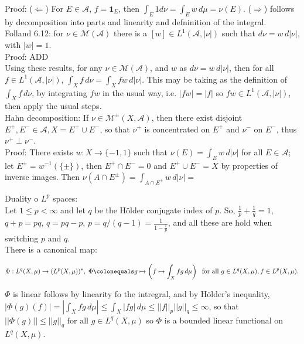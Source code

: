 \documentclass[12pt]{article}
\newcommand{\fall}[0] { \textrm{ for all } }
\newcommand{\rimply}[0] { \Rightarrow }
\newcommand{\limply}[0] { \Leftarrow }
\newcommand{\rarw}[0] { \rightarrow }
\newcommand{ \defeq }[0] { \colonequals }
\newcommand{ \cf }[1] { \mathbf{1}_{#1} }
\newcommand{\A}[0] { \mathcal{A} }
\newcommand{\M}[0] { \mathcal{M} }
\begin{document}
\noindent
Proof: ($\limply$) For $E \in \A$, $f = \cf{E}$, then $\int_E 1 d\nu = \int_E w \, d\mu = \nu(E)$. ($\rimply$) follows by decomposition into parts and linearity and defninition of the integral.   \\

Folland 6.12: for $\nu \in \M(\A)$ there is a $[w] \in L^1(\A, |\nu|)$ such that $d\nu = w \, d|\nu|$, with $|w| = 1$. \\

\noindent
Proof: ADD \\

Using these results, for any $\nu \in \M(\A)$, and $w$ as $d\nu = w \, d|\nu|$, then for all $f \in L^1(\A, |\nu|)$, $\int_X f \, d\nu = \int_X f w \, d|\nu|$. This may be taking as the definition of $\int_X f \, d\nu$, by integrating $f w$ in the usual way, i.e. $|fw| = |f|$ so $fw \in L^1(\A, |\nu|)$, then apply the usual steps. \\


Hahn decomposition: If $\nu \in \M^\pm(X, \A)$, then there exist disjoint $E^+, E^- \in \A, X = E^+ \cup E^-$, so that $\nu^+$ is concentrated on $E^+$ and $\nu^-$ on $E^-$, thus $\nu^+ \perp \nu^-$. \\

Proof: There exists $w: X \rarw \{-1, 1 \}$ such that $\nu(E) = \int_E w \, d|\nu|$ for all $E \in \A$; let $E^\pm = w^{-1}(\{ \pm \})$, then $E^+ \cap E^- = 0$ and $E^+ \cup E^- = X$ by properties of inverse images. Then $\nu(A \cap E^\pm) = \int_{A \cap E^\pm} w \, d|\nu| = $




\break

Duality o $L^p$ spaces: \\

\noindent
Let $1 \le p < \infty$ and let $q$ be the H\"{o}lder conjugate index of $p$. So, $\frac{1}{p} + \frac{1}{q} = 1$, $q+p = pq$, $q = pq-p$, $p=q/(q-1) = \frac{1}{1-{\frac{1}{p}}}$, and all these are hold when switching $p$ and $q$.   \\

\noindent
There is a canonical map:

$$
\Phi: L^q(X, \mu) \rarw  (L^p(X, \mu))^*, \; \Phi \defeq g \mapsto  \left( f \mapsto \int_X fg \, d\mu  \right) \; \fall g \in L^q(X, \mu), f \in L^p(X, \mu).
$$


\noindent
$\Phi$ is linear follows by linearity fo the intregral, and by H\"{o}lder's inequality, $|\Phi(g)(f) | = |\int_X fg \, d\mu| \le \int_X |fg| \, d\mu \le ||f||_p ||g||_q \le \infty$, so that $||\Phi(g)|| \le ||g||_q \fall g \in L^q(X, \mu)$ so $\Phi$ is a bounded linear functional on $L^q(X, \mu)$. \\
\end{document}
